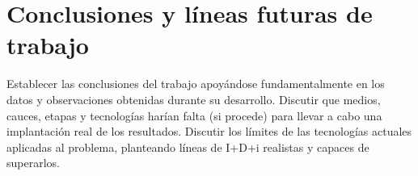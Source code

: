 \chapter{Conclusiones y líneas futuras de trabajo}

Establecer las conclusiones del trabajo apoyándose fundamentalmente en los datos y observaciones obtenidas durante su desarrollo. Discutir que medios, cauces, etapas y tecnologías harían falta (si procede) para llevar a cabo una implantación real de los resultados.
Discutir los límites de las tecnologías actuales aplicadas al problema, planteando líneas de I+D+i realistas y capaces de superarlos.